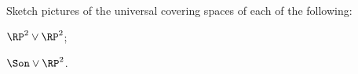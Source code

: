 Sketch pictures of the universal covering spaces of each of the
following: 
\begin{alist}
\item $\RP^2\vee \RP^2$;
\item $\Son \vee \RP^2$.
\end{alist}
